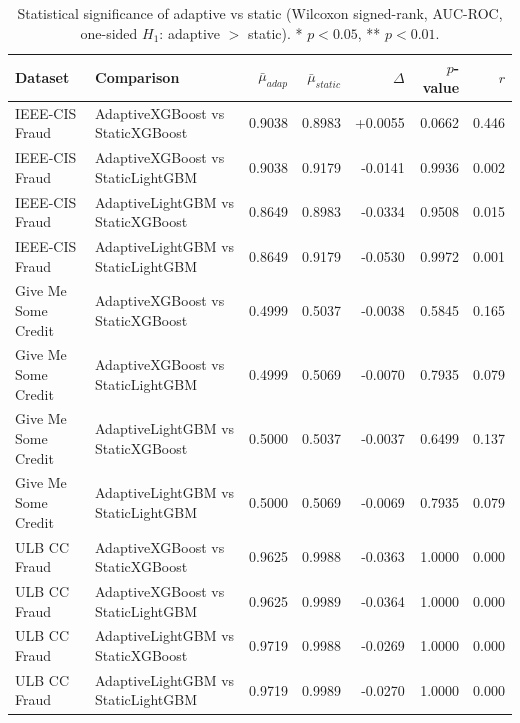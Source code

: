 \begin{table}[ht]
\centering
\caption{Statistical significance of adaptive vs static (Wilcoxon signed-rank, AUC-ROC, one-sided $H_1$: adaptive $>$ static). * $p{<}0.05$, ** $p{<}0.01$.}
\label{tab:stat_tests}
\begin{tabular}{llrrrrr}
\hline
Dataset & Comparison & $\bar{\mu}_{adap}$ & $\bar{\mu}_{static}$ & $\Delta$ & $p$-value & $r$ \\
\hline
IEEE-CIS Fraud & AdaptiveXGBoost vs StaticXGBoost & 0.9038 & 0.8983 & +0.0055 & 0.0662 & 0.446 \\
IEEE-CIS Fraud & AdaptiveXGBoost vs StaticLightGBM & 0.9038 & 0.9179 & -0.0141 & 0.9936 & 0.002 \\
IEEE-CIS Fraud & AdaptiveLightGBM vs StaticXGBoost & 0.8649 & 0.8983 & -0.0334 & 0.9508 & 0.015 \\
IEEE-CIS Fraud & AdaptiveLightGBM vs StaticLightGBM & 0.8649 & 0.9179 & -0.0530 & 0.9972 & 0.001 \\
Give Me Some Credit & AdaptiveXGBoost vs StaticXGBoost & 0.4999 & 0.5037 & -0.0038 & 0.5845 & 0.165 \\
Give Me Some Credit & AdaptiveXGBoost vs StaticLightGBM & 0.4999 & 0.5069 & -0.0070 & 0.7935 & 0.079 \\
Give Me Some Credit & AdaptiveLightGBM vs StaticXGBoost & 0.5000 & 0.5037 & -0.0037 & 0.6499 & 0.137 \\
Give Me Some Credit & AdaptiveLightGBM vs StaticLightGBM & 0.5000 & 0.5069 & -0.0069 & 0.7935 & 0.079 \\
ULB CC Fraud & AdaptiveXGBoost vs StaticXGBoost & 0.9625 & 0.9988 & -0.0363 & 1.0000 & 0.000 \\
ULB CC Fraud & AdaptiveXGBoost vs StaticLightGBM & 0.9625 & 0.9989 & -0.0364 & 1.0000 & 0.000 \\
ULB CC Fraud & AdaptiveLightGBM vs StaticXGBoost & 0.9719 & 0.9988 & -0.0269 & 1.0000 & 0.000 \\
ULB CC Fraud & AdaptiveLightGBM vs StaticLightGBM & 0.9719 & 0.9989 & -0.0270 & 1.0000 & 0.000 \\
\hline
\end{tabular}
\end{table}